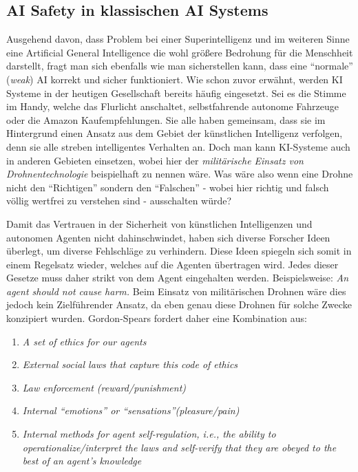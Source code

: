         \subsection{AI Safety in klassischen AI Systems}

        Ausgehend davon, dass Problem bei einer Superintelligenz und im weiteren Sinne eine Artificial General
        Intelligence die wohl größere Bedrohung für die Menschheit darstellt, fragt man sich ebenfalls wie man
        sicherstellen kann, dass eine ``normale'' (\textit{weak}) AI korrekt und sicher funktioniert. Wie schon
        zuvor erwähnt, werden KI Systeme in der heutigen Gesellschaft bereits häufig eingesetzt. Sei es die
        Stimme im Handy, welche das Flurlicht anschaltet, selbstfahrende autonome Fahrzeuge oder die Amazon
        Kaufempfehlungen. Sie alle haben gemeinsam, dass sie im Hintergrund einen Ansatz aus dem Gebiet der künstlichen
        Intelligenz verfolgen, denn sie alle streben intelligentes Verhalten an. Doch man kann KI-Systeme auch in
        anderen Gebieten einsetzen, wobei hier der \textit{militärische Einsatz von Drohnentechnologie} beispielhaft
        zu nennen wäre. \cite[p. 251]{Stulpe2018} Was wäre also wenn eine Drohne nicht den ``Richtigen'' sondern den
        ``Falschen'' - wobei hier richtig und falsch völlig wertfrei zu verstehen sind - ausschalten würde?

        Damit das Vertrauen in der Sicherheit von künstlichen Intelligenzen und autonomen Agenten nicht dahinschwindet,
        haben sich diverse Forscher Ideen überlegt, um diverse Fehlschläge zu verhindern.\cite[p. 257]{GordonSpears2003}
        Diese Ideen spiegeln sich somit in einem Regelsatz wieder, welches auf die Agenten übertragen wird. Jedes dieser
        Gesetze muss daher strikt von dem Agent eingehalten werden. Beispielsweise:
        \textit{An agent should not cause harm.} Beim Einsatz von militärischen Drohnen wäre dies jedoch kein
        Zielführender Ansatz, da eben genau diese Drohnen für solche Zwecke konzipiert wurden. Gordon-Spears fordert daher
        eine Kombination aus:

        \begin{enumerate}
            \item \textit{A set of ethics for our agents}
            \item \textit{External social laws that capture this code of ethics}
            \item \textit{Law enforcement (reward/punishment)}
            \item \textit{Internal ``emotions'' or ``sensations''(pleasure/pain)}
            \item \textit{Internal methods for agent self-regulation, i.e., the ability to operationalize/interpret the laws
            and self-verify that they are obeyed to the best of an agent's knowledge}
        \end{enumerate}

